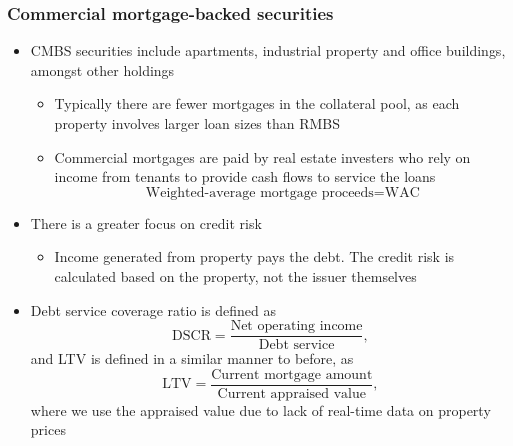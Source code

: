 \documentclass[../notes_compiled.tex]{subfiles}
\begin{document}
\subsubsection{Commercial mortgage-backed securities}
\begin{itemize}
\item CMBS securities include apartments, industrial property and office buildings, amongst other holdings
\begin{itemize}
\item Typically there are fewer mortgages in the collateral pool, as each property involves larger loan sizes than RMBS
\item Commercial mortgages are paid by real estate investers who rely on income from tenants to provide cash flows to service the loans
\begin{equation}
\text{Weighted-average mortgage proceeds} = \text{WAC}
\end{equation}
\end{itemize}
\item There is a greater focus on credit risk
\begin{itemize}
\item Income generated from property pays the debt. The credit risk is calculated based on the property, not the issuer themselves
\end{itemize}

\item Debt service coverage ratio is defined as
\begin{equation}
\text{DSCR} = \frac{\text{Net operating income}}{\text{Debt service}},
\end{equation}
and LTV is defined in a similar manner to before, as
\begin{equation}
\text{LTV} = \frac{\text{Current mortgage amount}}{\text{Current appraised value}},
\end{equation}
where we use the appraised value due to lack of real-time data on property prices


\end{itemize}
\end{document}
